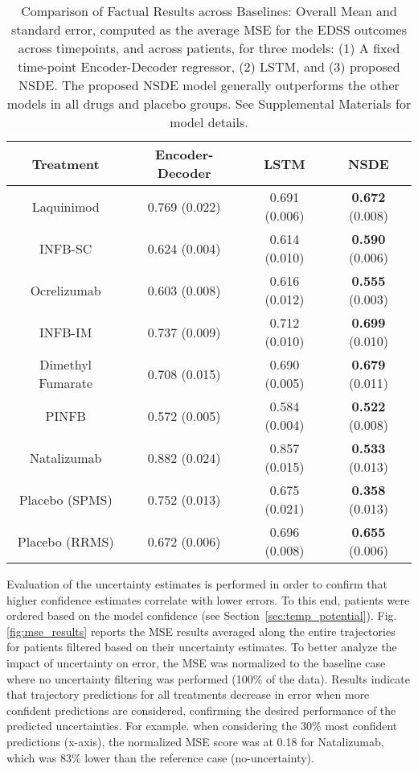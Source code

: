 \documentclass[runningheads]{llncs}
\begin{document}
\begin{table}
    \centering
    \begin{tabular}[width=\linewidth]{|c|c|c|c|}
             \hline
          Treatment  &  Encoder-Decoder & LSTM & NSDE \\ 
          \hline
         Laquinimod & 0.769 (0.022) & 0.691 (0.006) & \textbf{0.672} (0.008) \\
         INFB-SC     & 0.624 (0.004) & 0.614 (0.010) & \textbf{0.590} (0.006)  \\
         Ocrelizumab & 0.603 (0.008) & 0.616 (0.012) & \textbf{0.555} (0.003) \\
         INFB-IM     & 0.737 (0.009) & 0.712 (0.010)  & \textbf{0.699} (0.010) \\
         Dimethyl Fumarate & 0.708 (0.015) & 0.690 (0.005) & \textbf{0.679} (0.011)  \\
         PINFB           & 0.572 (0.005) & 0.584 (0.004) & \textbf{0.522} (0.008) \\
         Natalizumab     & 0.882 (0.024) & 0.857 (0.015) & \textbf{0.533} (0.013) \\
         Placebo (SPMS)  & 0.752 (0.013) & 0.675 (0.021) & \textbf{0.358} (0.013)  \\
         Placebo (RRMS)  & 0.672 (0.006) & 0.696 (0.008) & \textbf{0.655} (0.006)  \\
          \hline
     \end{tabular}
     \caption{Comparison of Factual Results across Baselines: Overall Mean and standard error, computed as the  average MSE for the EDSS outcomes across timepoints, and across patients, for three models: (1) A fixed time-point Encoder-Decoder regressor, (2) LSTM, and (3) proposed NSDE. 
     The proposed NSDE model generally outperforms the other models in all drugs and placebo groups. See Supplemental Materials for model details.}
     \label{tab:factualMSEtableTransposed}
 \end{table}

\noindent Evaluation of the uncertainty estimates is performed in order to confirm that higher confidence estimates correlate with lower errors. To this end, patients were ordered based on the model confidence (see Section~\ref{sec:temp_potential}). Fig.\ref{fig:mse_results} reports the MSE results averaged along the entire trajectories for patients filtered based on their uncertainty estimates. To better analyze the impact of uncertainty on error, the MSE was normalized to the baseline case where no uncertainty filtering was performed (100\% of the data). Results indicate that trajectory predictions for all treatments decrease in error when more confident predictions are considered, confirming the desired performance of the predicted uncertainties.  For example. when considering the 30\% most confident predictions (x-axis), the normalized MSE score was at 0.18 for Natalizumab, which was 83\% lower than the reference case (no-uncertainty).
\end{document}
